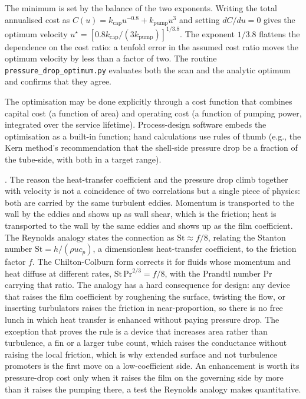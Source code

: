 

The minimum is set by the balance of the two exponents. Writing the
total annualised cost as $C(u) = k_{\text{cap}} u^{-0.8} +
k_{\text{pump}} u^{3}$ and setting $dC/du = 0$ gives the optimum
velocity $u^\star = [0.8 k_{\text{cap}}/(3 k_{\text{pump}})]^{1/3.8}$.
The exponent $1/3.8$ flattens the dependence on the cost ratio: a
tenfold error in the assumed cost ratio moves the optimum velocity by
less than a factor of two. The routine
\texttt{pressure\_drop\_optimum.py} evaluates both the scan and the
analytic optimum and confirms that they agree.

The optimisation may be done explicitly through a cost function that
combines capital cost (a function of area) and operating cost (a
function of pumping power, integrated over the service lifetime).
Process-design software embeds the optimisation as a built-in
function; hand calculations use rules of thumb (e.g., the Kern method's
recommendation that the shell-side pressure drop be a fraction of the
tube-side, with both in a target range).

. The
reason the heat-transfer coefficient and the pressure drop climb together with
velocity is not a coincidence of two correlations but a single piece of physics:
both are carried by the same turbulent eddies. Momentum is transported to the wall
by the eddies and shows up as wall shear, which is the friction; heat is
transported to the wall by the same eddies and shows up as the film coefficient.
The Reynolds analogy states the connection as $\mathrm{St} \approx f/8$, relating
the Stanton number $\mathrm{St} = h/(\rho u c_p)$, a dimensionless heat-transfer
coefficient, to the friction factor $f$. The Chilton-Colburn form corrects it for
fluids whose momentum and heat diffuse at different rates, $\mathrm{St}\,
\mathrm{Pr}^{2/3} = f/8$, with the Prandtl number $\mathrm{Pr}$ carrying that
ratio. The analogy has a hard consequence for design: any device that raises the
film coefficient by roughening the surface, twisting the flow, or inserting
turbulators raises the friction in near-proportion, so there is no free lunch in
which heat transfer is enhanced without paying pressure drop. The exception that
proves the rule is a device that increases area rather than turbulence, a fin or a
larger tube count, which raises the conductance without raising the local friction,
which is why extended surface and not turbulence promoters is the first move on a
low-coefficient side. An enhancement is worth its pressure-drop cost only when it
raises the film on the governing side by more than it raises the pumping there, a
test the Reynolds analogy makes quantitative.


